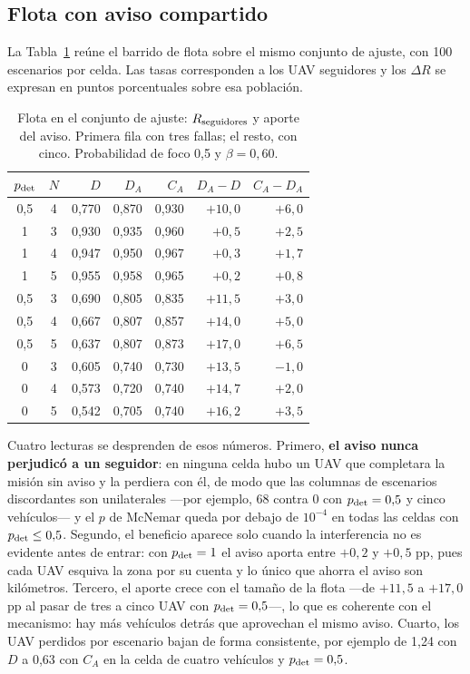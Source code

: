 \documentclass[journal,10pt]{IEEEtran}
\begin{document}
\subsection{Flota con aviso compartido}

La Tabla~\ref{tab:flota} reúne el barrido de flota sobre el mismo conjunto
de ajuste, con 100 escenarios por celda. Las tasas corresponden a los UAV
seguidores y los $\Delta R$ se expresan en puntos porcentuales sobre esa
población.

\begin{table}[!t]
\centering
\caption{Flota en el conjunto de ajuste: $R_{\rm seguidores}$ y aporte del aviso. Primera fila con tres fallas; el resto, con cinco. Probabilidad de foco 0,5 y $\beta=0{,}60$.}
\label{tab:flota}
\footnotesize
\begin{tabular}{@{}ccrrrrr@{}}
\toprule
$p_{\rm det}$ & $N$ & $D$ & $D_A$ & $C_A$ & $D_A\!-\!D$ & $C_A\!-\!D_A$ \\
\midrule
0,5 & 4 & 0,770 & 0,870 & 0,930 & $+10{,}0$ & $+6{,}0$ \\
\midrule
1   & 3 & 0,930 & 0,935 & 0,960 & $+0{,}5$  & $+2{,}5$ \\
1   & 4 & 0,947 & 0,950 & 0,967 & $+0{,}3$  & $+1{,}7$ \\
1   & 5 & 0,955 & 0,958 & 0,965 & $+0{,}2$  & $+0{,}8$ \\
0,5 & 3 & 0,690 & 0,805 & 0,835 & $+11{,}5$ & $+3{,}0$ \\
0,5 & 4 & 0,667 & 0,807 & 0,857 & $+14{,}0$ & $+5{,}0$ \\
0,5 & 5 & 0,637 & 0,807 & 0,873 & $+17{,}0$ & $+6{,}5$ \\
0   & 3 & 0,605 & 0,740 & 0,730 & $+13{,}5$ & $-1{,}0$ \\
0   & 4 & 0,573 & 0,720 & 0,740 & $+14{,}7$ & $+2{,}0$ \\
0   & 5 & 0,542 & 0,705 & 0,740 & $+16{,}2$ & $+3{,}5$ \\
\bottomrule
\end{tabular}
\end{table}

Cuatro lecturas se desprenden de esos números. Primero, \textbf{el aviso
nunca perjudicó a un seguidor}: en ninguna celda hubo un UAV que completara
la misión sin aviso y la perdiera con él, de modo que las columnas de
escenarios discordantes son unilaterales ---por ejemplo, 68 contra 0 con
$p_{\rm det}=0{,}5$ y cinco vehículos--- y el $p$ de McNemar queda por debajo
de $10^{-4}$ en todas las celdas con $p_{\rm det}\leq0{,}5$. Segundo, el
beneficio aparece solo cuando la interferencia no es evidente antes de
entrar: con $p_{\rm det}=1$ el aviso aporta entre $+0{,}2$ y $+0{,}5$ pp, pues
cada UAV esquiva la zona por su cuenta y lo único que ahorra el aviso son
kilómetros. Tercero, el aporte crece con el tamaño de la flota ---de $+11{,}5$
a $+17{,}0$ pp al pasar de tres a cinco UAV con $p_{\rm det}=0{,}5$---, lo que
es coherente con el mecanismo: hay más vehículos detrás que aprovechan el
mismo aviso. Cuarto, los UAV perdidos por escenario bajan de forma
consistente, por ejemplo de 1,24 con $D$ a 0,63 con $C_A$ en la celda de
cuatro vehículos y $p_{\rm det}=0{,}5$.
\end{document}
